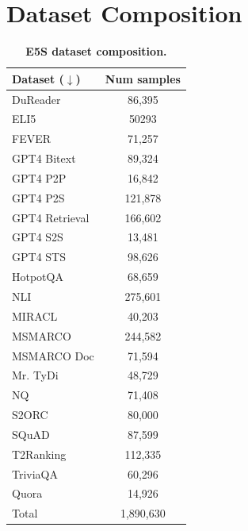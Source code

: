 \documentclass{article}
\begin{document}
\newpage

\section{Dataset Composition}
\label{sec:datasetcomp}

\begin{table}[!htb]
\begin{minipage}{.5\linewidth}
\centering
\caption{\textbf{E5S dataset composition.}}
\begin{tabular}{l|c}
\toprule
Dataset ($\downarrow$) & Num samples \\
\midrule
DuReader \cite{qiu2022dureaderretrieval} & 86,395 \\
ELI5 \cite{fan2019eli5} & 50293 \\
FEVER \cite{thorne2018fever} & 71,257 \\
GPT4 Bitext \cite{wang2024improving} & 89,324 \\
GPT4 P2P \cite{wang2024improving} & 16,842 \\
GPT4 P2S \cite{wang2024improving} & 121,878 \\
GPT4 Retrieval \cite{wang2024improving} & 166,602 \\
GPT4 S2S \cite{wang2024improving} & 13,481 \\
GPT4 STS \cite{wang2024improving} & 98,626 \\
HotpotQA \cite{yang2018hotpotqa} & 68,659 \\
NLI \cite{gao2022simcse} & 275,601 \\
MIRACL \cite{zhang2022making} & 40,203 \\
MSMARCO \cite{bajaj2018ms} & 244,582 \\
MSMARCO Doc \cite{bajaj2018ms} & 71,594 \\
Mr. TyDi \cite{zhang2021mr} & 48,729 \\
NQ \cite{kwiatkowski2019natural} & 71,408 \\
S2ORC \cite{lo2020s2orc} & 80,000 \\
SQuAD \cite{rajpurkar2016squad} & 87,599 \\
T2Ranking \cite{xie2023t2ranking} & 112,335 \\
TriviaQA \cite{karpukhin2020dense} & 60,296 \\
Quora \cite{quora-question-pairs} & 14,926 \\
\midrule
Total & 1,890,630 \\
\bottomrule
\end{tabular}
\end{minipage}
\begin{minipage}{.5\linewidth}


\end{minipage}
\end{table}
\end{document}
